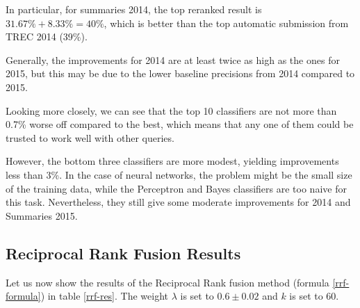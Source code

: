 In particular, for summaries 2014, the top reranked result is $31.67\%+8.33\% = 40\%$, which is better than the top automatic submission
from TREC 2014 (39\%).

Generally, the improvements for 2014 are at least 
twice as high as the ones for 2015, but this may be due to the lower baseline precisions from 2014 compared to 2015.

Looking more closely, we can see that the top 10 classifiers are not more than 0.7\% worse off compared to the best,
which means that any one of them could be trusted to work well with other queries.

However, the bottom three classifiers are more modest, yielding improvements less than 3\%.
In the case of neural networks, the problem might be the small size of the training data,
while the Perceptron and Bayes classifiers are too naive for this task.
Nevertheless, they still give some moderate improvements for 2014 and Summaries 2015.

\subsection{Reciprocal Rank Fusion Results}
Let us now show the results of the Reciprocal Rank fusion method (formula \ref{rrf-formula}) in table \ref{rrf-res}.
The weight $\lambda$ is set to $0.6\pm 0.02$ and $k$ is set to 60.

